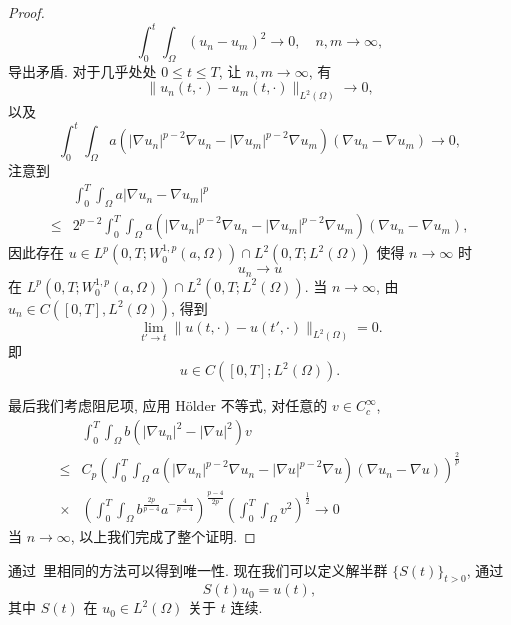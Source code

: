 \documentclass[twoside,longtitle]{LZUthesis}
\theoremstyle{definition}
\numberwithin{equation}{chapter}
\newcommand*\abs[1]{\lvert#1\rvert}
\newcommand*\norm[1]{\lVert#1\rVert}
\newcommand*\Brace[1]{\lbrace#1\rbrace}
\begin{document}
\begin{proof}
\begin{equation}
		\int_0^t\int_{\Omega}\left(u_n-u_m\right)^2 \to 0, \quad n, m \to \infty,
	\end{equation}
	导出矛盾. 对于几乎处处 $0 \leq t \leq T$, 让 $n,m \to \infty$, 有
	\begin{equation}\label{cauchy_in_L2}
		\norm{u_n(t,\cdot)-u_m(t,\cdot)}_{L^2(\Omega)} \to 0,
	\end{equation}
	以及
	\begin{equation}\label{cauchy_in_W1pa}
		\int_{0}^{t}\int_{\Omega}a
		\left(\abs{\nabla u_n}^{p-2}\nabla u_n
		- \abs{\nabla u_m}^{p-2}\nabla u_m\right)
		\left(\nabla u_n - \nabla u_m\right)
		\to 0,
	\end{equation}
	注意到
	\begin{equation}
		\begin{split}
			& \int_0^T\int_{\Omega}a\abs{\nabla u_n - \nabla u_m}^p\\
			\leq{} & 2^{p-2}\int_{0}^{T}\int_{\Omega}a
			\left(\abs{\nabla u_n}^{p-2}\nabla u_n
			- \abs{\nabla u_m}^{p-2}\nabla u_m\right)
			\left(\nabla u_n - \nabla u_m\right),
		\end{split}
	\end{equation}
	因此存在 $u \in L^p(0, T; W_0^{1,p}(a,\Omega))
	\cap L^2(0, T; L^2(\Omega))$ 使得 $n \to \infty$ 时
	\begin{equation}
		u_{n} \to u
	\end{equation}
	在 $L^p(0, T; W_0^{1,p}(a,\Omega))\cap L^2(0, T; L^2(\Omega))$.
	当 $n \to \infty$, 由 $u_n \in C([0, T], L^2(\Omega))$, 得到
	\begin{equation}
		\lim_{t' \to t}\norm{u(t,\cdot)-u(t',\cdot)}_{L^2(\Omega)}=0.
	\end{equation}
	即
	\begin{equation*}
		u \in C([0, T]; L^2(\Omega)).
	\end{equation*}

	最后我们考虑阻尼项, 应用 H\"older 不等式,
	对任意的 $v \in C_c^\infty$,
	\begin{equation}
		\begin{split}
			& \int_0^T\int_{\Omega}b\left(\abs{\nabla u_n}^2
			- \abs{\nabla u}^2\right)v\\
			\leq{} & C_p\left(\int_0^T\int_{\Omega}a
			\left(\abs{\nabla u_n}^{p-2}\nabla u_n
			- \abs{\nabla u}^{p-2}\nabla u\right)
			\left(\nabla u_n - \nabla u\right)\right)^{\frac{2}{p}}\\
			\times{} & \left(\int_0^T\int_{\Omega}b^{\frac{2p}{p-4}}a^{-\frac{4}{p-4}}\right)^{\frac{p-4}{2p}}
			\left(\int_0^T\int_{\Omega}v^2\right)^{\frac{1}{2}} \to 0
		\end{split}
	\end{equation}
	当 $n \to \infty$, 以上我们完成了整个证明.
\end{proof}
通过~\cite{Zhan2019Uniquenessa}里相同的方法可以得到唯一性.
现在我们可以定义解半群 $\Brace{S(t)}_{t>0}$,
通过
\begin{equation}
	S(t)u_0 = u(t),
\end{equation}
其中 $S(t)$ 在 $u_{0} \in L^2(\Omega)$ 关于 $t$ 连续.
\end{document}
